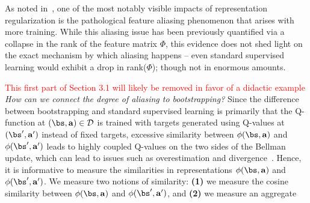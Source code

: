 As noted in~\citep{kumar2021implicit}, one of the most notably visible impacts of representation regularization is the pathological feature aliasing phenomenon that arises with more training. While this aliasing issue has been previously quantified via a collapse in the rank of the feature matrix $\Phi$, this evidence does not shed light on the exact mechanism by which aliasing happens -- even standard supervised learning would exhibit a drop in rank($\Phi$); though not in enormous amounts. %

\textcolor{red}{This first part of Section 3.1 will likely be removed in favor of a didactic example} \textit{How can we connect the degree of aliasing to bootstrapping?} Since the difference between bootstrapping and standard supervised learning is primarily that the Q-function at $(\bs, \mathbf{a}) \in \mathcal{D}$ is trained  with targets generated using Q-values at $(\bs', \mathbf{a}')$ instead of fixed targets, excessive similarity between $\phi(\bs, \mathbf{a})$ and $\phi(\bs', \mathbf{a}')$ leads to highly coupled Q-values on the two sides of the Bellman update, which can lead to issues such as overestimation and divergence~\citep{durugkar2018td}. Hence, it is informative to measure the similarities in representations $\phi(\bs, \mathbf{a})$ and $\phi(\bs', \mathbf{a}')$. We measure two notions of similarity: \textbf{(1)} we measure the cosine similarity between $\phi(\bs, \mathbf{a})$ and $\phi(\bs', \mathbf{a}')$, and \textbf{(2)} we measure an aggregate    

